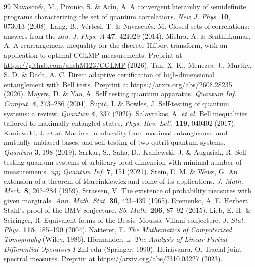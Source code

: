 \begin{thebibliography}{99}
 Navascu\'{e}s, M., Pironio, S. \& Ac\'{\i}n, A. A convergent hierarchy of semidefinite programs characterizing the set of quantum correlations. \textit{New J. Phys.} \textbf{10}, 073013 (2008).
 Lang, B., V\'{e}rtesi, T. \& Navascu\'{e}s, M. Closed sets of correlations: answers from the zoo. \textit{J. Phys. A} \textbf{47}, 424029 (2014).
 Mishra, A. \& Senthilkumar, A. A rearrangement inequality for the discrete Hilbert transform, with an application to optimal CGLMP measurements. Preprint at \url{https://github.com/anshM123/CGLMP} (2026).
 Tan, X. K., Menezes, J., Murthy, S. D. \& Dada, A. C. Direct adaptive certification of high-dimensional entanglement with Bell tests. Preprint at \url{https://arxiv.org/abs/2608.28235} (2026).
 Mayers, D. \& Yao, A. Self testing quantum apparatus. \textit{Quantum Inf. Comput.} \textbf{4}, 273--286 (2004).
 \v{S}upi\'{c}, I. \& Bowles, J. Self-testing of quantum systems: a review. \textit{Quantum} \textbf{4}, 337 (2020).
 Salavrakos, A. \textit{et al.} Bell inequalities tailored to maximally entangled states. \textit{Phys. Rev. Lett.} \textbf{119}, 040402 (2017).
 Kaniewski, J. \textit{et al.} Maximal nonlocality from maximal entanglement and mutually unbiased bases, and self-testing of two-qutrit quantum systems. \textit{Quantum} \textbf{3}, 198 (2019).
 Sarkar, S., Saha, D., Kaniewski, J. \& Augusiak, R. Self-testing quantum systems of arbitrary local dimension with minimal number of measurements. \textit{npj Quantum Inf.} \textbf{7}, 151 (2021).
 Stein, E. M. \& Weiss, G. An extension of a theorem of Marcinkiewicz and some of its applications. \textit{J. Math. Mech.} \textbf{8}, 263--284 (1959).
 Strassen, V. The existence of probability measures with given marginals. \textit{Ann. Math. Stat.} \textbf{36}, 423--439 (1965).
 Eremenko, A. E. Herbert Stahl's proof of the BMV conjecture. \textit{Sb. Math.} \textbf{206}, 87--92 (2015).
 Lieb, E. H. \& Seiringer, R. Equivalent forms of the Bessis--Moussa--Villani conjecture. \textit{J. Stat. Phys.} \textbf{115}, 185--190 (2004).
 Natterer, F. \textit{The Mathematics of Computerized Tomography} (Wiley, 1986).
 H\"{o}rmander, L. \textit{The Analysis of Linear Partial Differential Operators I} 2nd edn (Springer, 1990).
 Hein\"{a}vaara, O. Tracial joint spectral measures. Preprint at \url{https://arxiv.org/abs/2310.03227} (2023).

\end{thebibliography}

